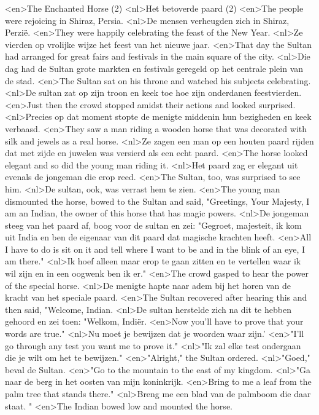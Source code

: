 <en>The Enchanted Horse (2)
<nl>Het betoverde paard (2)
<en>The people were rejoicing in Shiraz, Persia.
<nl>De mensen verheugden zich in Shiraz, Perzië.
<en>They were happily celebrating the feast of the New Year.
<nl>Ze vierden op vrolijke wijze  het feest van het nieuwe jaar.
<en>That day the Sultan had arranged for great fairs and festivals in the main square of the city.
<nl>Die dag had de Sultan grote markten en festivals geregeld op het centrale plein van de stad.
<en>The Sultan sat on his throne and watched his subjects celebrating.
<nl>De sultan zat op zijn troon en keek toe hoe zijn onderdanen feestvierden.
<en>Just then the crowd stopped amidst their actions and looked surprised.
<nl>Precies op dat moment stopte de menigte middenin hun bezigheden en keek verbaasd.
<en>They saw a man riding a wooden horse that was decorated with silk and jewels as a real horse.
<nl>Ze zagen een man op een houten paard rijden dat  met zijde en juwelen was versierd als een echt paard.
<en>The horse looked elegant and so did the young man riding it.
<nl>Het paard zag er elegant uit evenals  de jongeman die erop reed.
<en>The Sultan, too, was surprised to see him.
<nl>De sultan, ook, was verrast hem te zien.
<en>The young man dismounted the horse, bowed to the Sultan and said, "Greetings, Your Majesty, I am an Indian, the owner of this horse that has magic powers.
<nl>De jongeman steeg van het paard af, boog voor de sultan en zei: "Gegroet, majesteit, ik kom uit India en ben de eigenaar van dit paard dat magische krachten heeft.
<en>All I have to do is sit on it and tell where I want to be and in the blink of an eye, I am there."
<nl>Ik hoef alleen maar erop te gaan zitten en te vertellen waar ik wil zijn en in een oogwenk ben ik er."
<en>The crowd gasped to hear the power of the special horse.
<nl>De menigte hapte naar adem bij het horen van  de kracht van het speciale paard.
<en>The Sultan recovered after hearing this and then said, "Welcome, Indian.
<nl>De sultan herstelde zich na dit te hebben gehoord en zei toen: "Welkom, Indi\"er.
<en>Now you'll have to prove that your words are true."
<nl>Nu moet je bewijzen dat je woorden waar zijn.'
<en>"I'll go through any test you want me to prove it."
<nl>"Ik zal elke test ondergaan die je wilt om het te bewijzen."
<en>"Alright," the Sultan ordered.
<nl>"Goed," beval de Sultan.
<en>"Go to the mountain to the east of my kingdom.
<nl>"Ga naar de berg in het oosten van mijn koninkrijk.
<en>Bring to me a leaf from the palm tree that stands there."
<nl>Breng me een blad van de palmboom die daar staat. "
<en>The Indian bowed low and mounted the horse.

